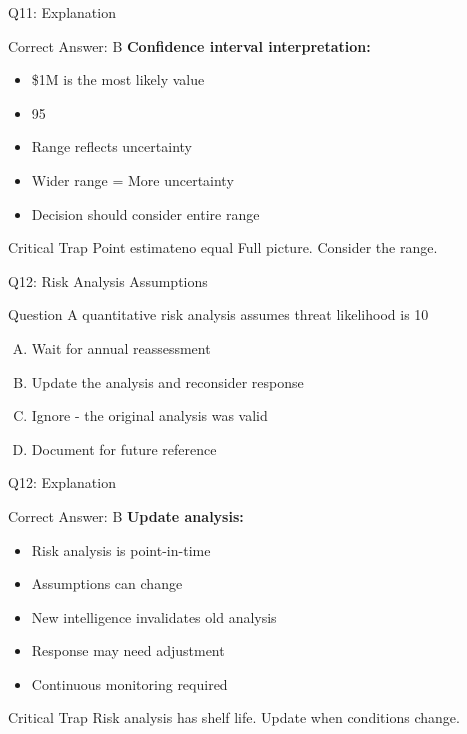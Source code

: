 \documentclass{beamer}
\begin{document}
		\begin{frame}{Q11: Explanation}
			\begin{block}{Correct Answer: B}
				\textbf{Confidence interval interpretation:}
				\begin{itemize}
					\item \$1M is the most likely value
					\item 95%
					\item Range reflects uncertainty
					\item Wider range = More uncertainty
					\item Decision should consider entire range
				\end{itemize}
			\end{block}
			\begin{alertblock}{Critical Trap}
				Point estimateno equal Full picture. Consider the range.
			\end{alertblock}
		\end{frame}
		
		\begin{frame}{Q12: Risk Analysis Assumptions}
			\begin{block}{Question}
				A quantitative risk analysis assumes threat likelihood is 10%
			\end{block}
			\begin{enumerate}[(A)]
				\item Wait for annual reassessment
				\item Update the analysis and reconsider response
				\item Ignore - the original analysis was valid
				\item Document for future reference
			\end{enumerate}
		\end{frame}
		
		\begin{frame}{Q12: Explanation}
			\begin{block}{Correct Answer: B}
				\textbf{Update analysis:}
				\begin{itemize}
					\item Risk analysis is point-in-time
					\item Assumptions can change
					\item New intelligence invalidates old analysis
					\item Response may need adjustment
					\item Continuous monitoring required
				\end{itemize}
			\end{block}
			\begin{alertblock}{Critical Trap}
				Risk analysis has shelf life. Update when conditions change.
			\end{alertblock}
		\end{frame}
		
\end{document}
